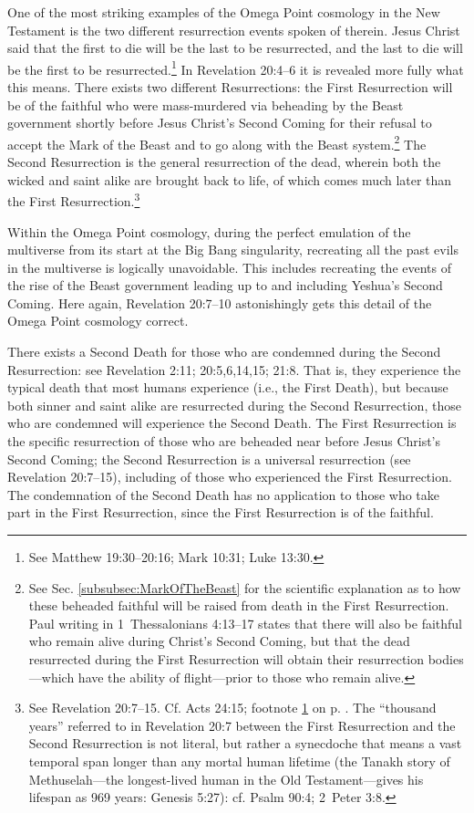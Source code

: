 \documentclass[letterpaper,12pt]{article}
\begin{document}
One of the most striking examples of the Omega Point cosmology in the New Testament is the two different resurrection events spoken of therein. Jesus Christ said that the first to die will be the last to be resurrected, and the last to die will be the first to be resurrected.\footnote{\label{foot:FirstAreLast}See Matthew 19:30--20:16; Mark 10:31; Luke 13:30.} In Revelation 20:4--6 it is revealed more fully what this means. There exists two different Resurrections: the First Resurrection will be of the faithful who were mass-murdered via beheading by the Beast government shortly before Jesus Christ's Second Coming for their refusal to accept the Mark of the Beast and to go along with the Beast system.\footnote{See Sec. \ref{subsubsec:MarkOfTheBeast} for the scientific explanation as to how these beheaded faithful will be raised from death in the First Resurrection. Paul writing in 1~Thessalonians 4:13--17 states that there will also be faithful who remain alive during Christ's Second Coming, but that the dead resurrected during the First Resurrection will obtain their resurrection bodies---which have the ability of flight---prior to those who remain alive.} The Second Resurrection is the general resurrection of the dead, wherein both the wicked and saint alike are brought back to life, of which comes much later than the First Resurrection.\footnote{See Revelation 20:7--15. Cf. Acts 24:15; footnote \ref{foot:FirstAreLast} on p. \pageref{foot:FirstAreLast}. The ``thousand years'' referred to in Revelation 20:7 between the First Resurrection and the Second Resurrection is not literal, but rather a synecdoche that means a vast temporal span longer than any mortal human lifetime (the Tanakh story of Methuselah---the longest-lived human in the Old Testament---gives his lifespan as 969 years: Genesis 5:27): cf. Psalm 90:4; 2~Peter 3:8.}

Within the Omega Point cosmology, during the perfect emulation of the multiverse from its start at the Big Bang singularity, recreating all the past evils in the multiverse is logically unavoidable. This includes recreating the events of the rise of the Beast government leading up to and including Yeshua's Second Coming. Here again, Revelation 20:7--10 astonishingly gets this detail of the Omega Point cosmology correct.

There exists a Second Death for those who are condemned during the Second Resurrection: see Revelation 2:11; 20:5,6,14,15; 21:8. That is, they experience the typical death that most humans experience (i.e., the First Death), but because both sinner and saint alike are resurrected during the Second Resurrection, those who are condemned will experience the Second Death. The First Resurrection is the specific resurrection of those who are beheaded near before Jesus Christ's Second Coming; the Second Resurrection is a universal resurrection (see Revelation 20:7--15), including of those who experienced the First Resurrection. The condemnation of the Second Death has no application to those who take part in the First Resurrection, since the First Resurrection is of the faithful.
\end{document}
